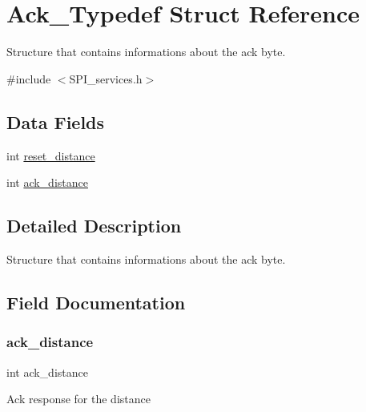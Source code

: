 \hypertarget{struct_ack___typedef}{}\section{Ack\+\_\+\+Typedef Struct Reference}
\label{struct_ack___typedef}


Structure that contains informations about the ack byte.  




{\ttfamily \#include $<$S\+P\+I\+\_\+services.\+h$>$}

\subsection*{Data Fields}
\begin{DoxyCompactItemize}
\item 
int \hyperlink{struct_ack___typedef_ab13e4799894e208a6335588da08f79db}{reset\+\_\+distance}
\item 
int \hyperlink{struct_ack___typedef_ad7dc2087e842517b68e3624140176a8d}{ack\+\_\+distance}
\end{DoxyCompactItemize}


\subsection{Detailed Description}
Structure that contains informations about the ack byte. 

\subsection{Field Documentation}
\mbox{\label{struct_ack___typedef_ad7dc2087e842517b68e3624140176a8d}} 
\subsubsection{\texorpdfstring{ack\+\_\+distance}{ack\_distance}}
{\footnotesize\ttfamily int ack\+\_\+distance}

Ack response for the distance \mbox{\label{struct_ack___typedef_ab13e4799894e208a6335588da08f79db}} 
